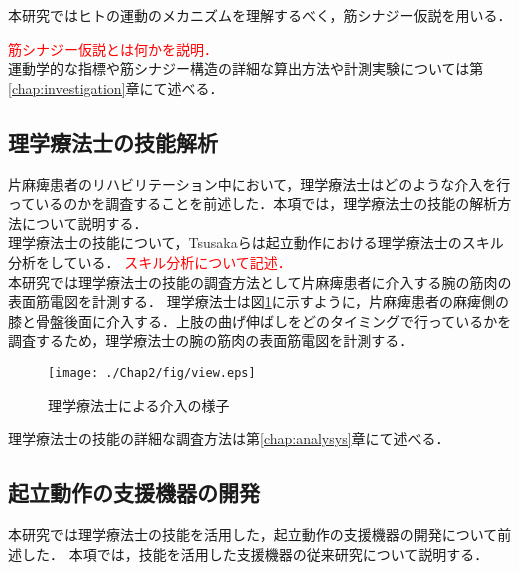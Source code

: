 本研究ではヒトの運動のメカニズムを理解するべく，筋シナジー仮説を用いる．


\textcolor{red}{筋シナジー仮説とは何かを説明．}
\\

運動学的な指標や筋シナジー構造の詳細な算出方法や計測実験については第\ref{chap:investigation}章にて述べる．

\subsection{理学療法士の技能解析}
\label{subsec:analysys_chap2}

片麻痺患者のリハビリテーション中において，理学療法士はどのような介入を行っているのかを調査することを前述した．本項では，理学療法士の技能の解析方法について説明する．\\

理学療法士の技能について，Tsusakaらは起立動作における理学療法士のスキル分析をしている\cite{Tsusaka2015}．
\textcolor{red}{スキル分析について記述．}\\

本研究では理学療法士の技能の調査方法として片麻痺患者に介入する腕の筋肉の表面筋電図を計測する．
理学療法士は図\ref{fig:view}に示すように，片麻痺患者の麻痺側の膝と骨盤後面に介入する．上肢の曲げ伸ばしをどのタイミングで行っているかを調査するため，理学療法士の腕の筋肉の表面筋電図を計測する．
\\

\begin{figure}[b]
	\begin{center}
		\texttt{[image: ./Chap2/fig/view.eps]}
		\caption{理学療法士による介入の様子}
		\label{fig:view}
	\end{center}
\end{figure}

理学療法士の技能の詳細な調査方法は第\ref{chap:analysys}章にて述べる．


\subsection{起立動作の支援機器の開発}
\label{subsec:development_chap2}

本研究では理学療法士の技能を活用した，起立動作の支援機器の開発について前述した．
本項では，技能を活用した支援機器の従来研究について説明する．\\

